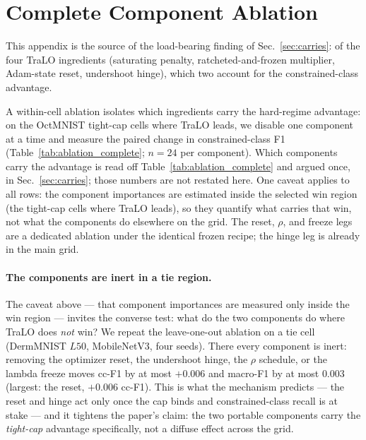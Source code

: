 \documentclass[10pt]{article}
\begin{document}
\section{Complete Component Ablation}
\label{app:ablation}

This appendix is the source of the load-bearing finding of
Sec.~\ref{sec:carries}: of the four TraLO ingredients (saturating
penalty, ratcheted-and-frozen multiplier, Adam-state reset, undershoot
hinge), which two account for the constrained-class advantage.

A within-cell ablation isolates which ingredients carry the hard-regime
advantage: on the OctMNIST tight-cap cells where TraLO leads, we disable
one component at a time and measure the paired change in
constrained-class F1 (Table~\ref{tab:ablation_complete}; $n{=}24$ per
component).
{Which components carry the advantage is read off
Table~\ref{tab:ablation_complete} and argued once, in Sec.~\ref{sec:carries};
those numbers are not restated here.}   One caveat
applies to all rows: the component importances are estimated inside the
selected win region (the tight-cap cells where TraLO leads), so they
quantify what carries that win, not what the components do elsewhere on
the grid. The reset, $\rho$, and freeze legs are a dedicated ablation
under the identical frozen recipe; the hinge leg is already in the main
grid.

{\paragraph{The components are inert in a tie region.}
The caveat above --- that component importances are measured only inside the win
region --- invites the converse test: what do the two components do where TraLO does
\emph{not} win? We repeat the leave-one-out ablation on a tie cell (DermMNIST $L50$,
MobileNetV3, four seeds). There every component is inert: removing the optimizer
reset, the undershoot hinge, the $\rho$ schedule, or the lambda freeze moves cc-F1 by
at most $+0.006$ and macro-F1 by at most $0.003$ (largest: the reset, $+0.006$ cc-F1).
This is what the mechanism predicts --- the reset and hinge act only once the cap binds
and constrained-class recall is at stake --- and it tightens the paper's claim: the two
portable components carry the \emph{tight-cap} advantage specifically, not a diffuse
effect across the grid.}
\end{document}
